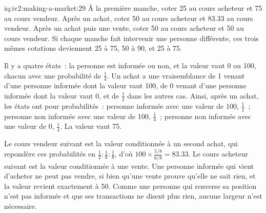 \begin{solution}{iq:iv2:making-a-market:29}
À la première manche, coter 25 au cours acheteur et 75 au cours vendeur. Après un achat, coter 50 au cours acheteur et 83.33 au cours vendeur. Après un achat puis une vente, coter 50 au cours acheteur et 50 au cours vendeur. Si chaque manche fait intervenir une personne différente, ces trois mêmes cotations deviennent 25 à 75, 50 à 90, et 25 à 75.

Il y a quatre états~: la personne est informée ou non, et la valeur vaut 0 ou 100, chacun avec une probabilité de $\tfrac14$. Un achat a une vraisemblance de 1 venant d'une personne informée dont la valeur vaut 100, de 0 venant d'une personne informée dont la valeur vaut 0, et de $\tfrac12$ dans les autres cas. Ainsi, après un achat, les états ont pour probabilités~: personne informée avec une valeur de 100, $\tfrac12$~; personne non informée avec une valeur de 100, $\tfrac14$~; personne non informée avec une valeur de 0, $\tfrac14$. La valeur vaut 75.

Le cours vendeur suivant est la valeur conditionnée à un second achat, qui repondère ces probabilités en $\tfrac12 : \tfrac18 : \tfrac18$, d'où $100 \times \tfrac{5/8}{6/8} = 83.33$. Le cours acheteur suivant est la valeur conditionnée à une vente. Une personne informée qui vient d'acheter ne peut pas vendre, si bien qu'une vente prouve qu'elle ne sait rien, et la valeur revient exactement à 50. Comme une personne qui renverse sa position n'est pas informée et que ses transactions ne disent plus rien, aucune largeur n'est nécessaire.

\end{solution}

